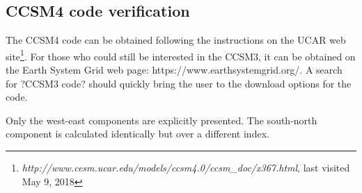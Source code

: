 \begin{appendices}
%
%

%

\section{CCSM4 code verification}\label{cver}

The CCSM4 code can be obtained following the instructions on the UCAR web site\footnote{\textit{http://www.cesm.ucar.edu/models/ccsm4.0/ccsm\_doc/x367.html}, last visited May 9, 2018}. For those who could still be interested in the CCSM3, it can be obtained on the Earth System Grid web page: https://www.earthsystemgrid.org/. A search for ?CCSM3 code? should quickly bring the user to the download options for the code.

Only the west-east components are explicitly presented. The south-north component is calculated identically but over a different index. 


\end{appendices}
